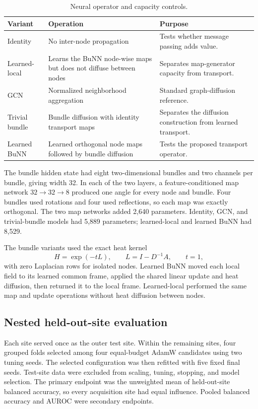 \documentclass[11pt,a4paper]{article}
\begin{document}
\begin{table}[htbp]
\centering
\caption{Neural operator and capacity controls.}
\label{tab:operators}
\begin{tabularx}{\textwidth}{@{}p{2.8cm}Y Y@{}}
\toprule
\textbf{Variant} & \textbf{Operation} & \textbf{Purpose} \\
\midrule
Identity & No inter-node propagation & Tests whether message passing adds value. \\
Learned-local & Learns the BuNN node-wise maps but does not diffuse between nodes & Separates map-generator capacity from transport. \\
GCN & Normalized neighborhood aggregation & Standard graph-diffusion reference. \\
Trivial bundle & Bundle diffusion with identity transport maps & Separates the diffusion construction from learned transport. \\
Learned BuNN & Learned orthogonal node maps followed by bundle diffusion & Tests the proposed transport operator. \\
\bottomrule
\end{tabularx}
\end{table}

The bundle hidden state had eight two-dimensional bundles and two channels per
bundle, giving width 32. In each of the two layers, a feature-conditioned map
network $32\rightarrow32\rightarrow8$ produced one angle for every node and
bundle. Four bundles used rotations and four used reflections, so each map was
exactly orthogonal. The two map networks added 2,640 parameters. Identity, GCN,
and trivial-bundle models had 5,889 parameters; learned-local and learned BuNN
had 8,529.

The bundle variants used the exact heat kernel
\[
H=\exp(-tL),\qquad L=I-D^{-1}A,\qquad t=1,
\]
with zero Laplacian rows for isolated nodes. Learned BuNN moved each local
field to its learned common frame, applied the shared linear update and heat
diffusion, then returned it to the local frame. Learned-local performed the
same map and update operations without heat diffusion between nodes.

\subsection{Nested held-out-site evaluation}

Each site served once as the outer test site. Within the remaining sites, four
grouped folds selected among four equal-budget AdamW candidates using two
tuning seeds. The selected configuration was then refitted with five fixed
final seeds. Test-site data were excluded from scaling, tuning, stopping, and
model selection. The primary endpoint was the unweighted mean of held-out-site
balanced accuracy, so every acquisition site had equal influence. Pooled
balanced accuracy and AUROC were secondary endpoints.
\end{document}
